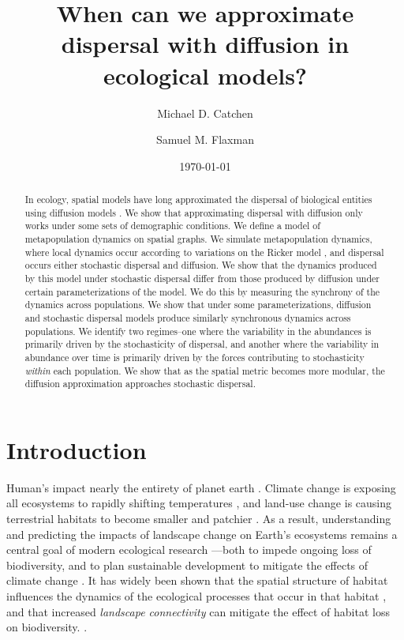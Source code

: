 \documentclass[]{article}
\title{When can we approximate dispersal with diffusion in ecological models?  \\}
\author[1,2]{Michael D. Catchen}
\author[1]{Samuel M. Flaxman}
\affil[1]{\small{Department of Ecology and Evolutionary Biology, University of Colorado at Boulder}}
\affil[2]{\small{Department of Biology, McGill University}}
\date{\today}
\begin{document}
\maketitle{}
\begin{abstract}

In ecology, spatial models have long approximated the dispersal of biological entities using diffusion models \cite{hastings_1978, okubo_diffusion_2001}.
We show that approximating dispersal with diffusion only works under some sets of demographic conditions.
We define a model of metapopulation dynamics on spatial graphs. 
We simulate metapopulation dynamics, where local dynamics occur according to variations on 
the Ricker model \cite{melbourne_hastings_2008}, and dispersal occurs either stochastic dispersal and diffusion. 
We show that the dynamics produced by this model under stochastic dispersal differ from those produced by diffusion under certain parameterizations of the model. 
We do this by measuring the synchrony of the dynamics across populations. We show that under some parameterizations, diffusion and stochastic dispersal models produce similarly synchronous dynamics across populations.
We identify two regimes--one where the variability in the abundances is primarily driven by 
the stochasticity of dispersal, and another where the variability in abundance over time is primarily driven by the forces contributing to stochasticity \textit{within} each population.
We show that as the spatial metric becomes more modular, the diffusion approximation approaches stochastic dispersal.

\end{abstract}
\clearpage
\tableofcontents
\clearpage




\clearpage
\section{Introduction}

Human's impact nearly the entirety of planet earth \cite{watson_protect_2018}.
Climate change is exposing all ecosystems to rapidly shifting temperatures \cite{pereira_scenarios_2010}, and land-use change is causing terrestrial habitats to become smaller and patchier \cite{haddad_habitat_2015}. As a result, understanding and predicting the impacts of landscape change on Earth's ecosystems remains a central goal of modern ecological research \cite{fletcher_spatial_2019, fischer_landscape_2007}---both to impede ongoing loss of biodiversity, and to plan sustainable development to mitigate the effects of climate change \cite{albert_applying_2017,baguette_individual_2013}. 
It has widely been shown that the spatial structure of habitat influences the dynamics of the ecological processes that occur in that habitat \cite{haddad_experimental_2017, ricketts_matrix_2001, gilbert_corridors_1998, taylor_connectivity_1993}, and that increased \textit{landscape connectivity} can mitigate the effect of habitat loss on biodiversity. 
\cite{resasco_meta-analysis_2019,
thompson_loss_2017, chisholm_metacommunity_2011}. 
\end{document}
